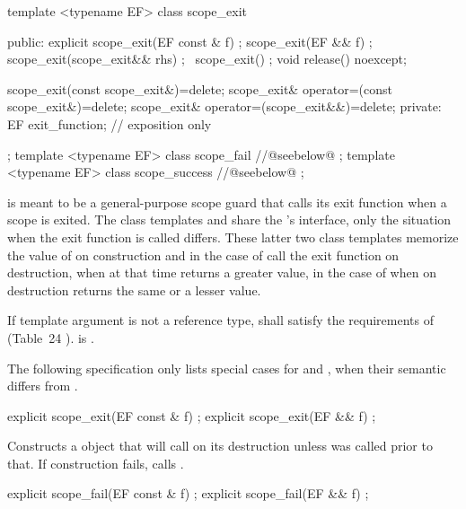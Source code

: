 \documentclass[ebook,11pt,article]{memoir}
\begin{document}
\begin{codeblock}
template <typename EF>
class scope_exit {
public:
  explicit
  scope_exit(EF const & f) ;
  scope_exit(EF && f) ;
  scope_exit(scope_exit&& rhs) ;
  ~scope_exit() ;
  void release() noexcept;

  scope_exit(const scope_exit&)=delete;
  scope_exit& operator=(const scope_exit&)=delete;
  scope_exit& operator=(scope_exit&&)=delete;
private:
  EF exit_function;    // exposition only
};
template <typename EF>
class scope_fail {
//@seebelow@
};
template <typename EF>
class scope_success {
//@seebelow@
};

\end{codeblock}
\pnum
\enternote
{} is meant to be a general-purpose scope guard that calls its exit function when a scope is exited. The class templates  and  share the 's interface, only the situation when the exit function is called differs. These latter two class templates memorize the value of  on construction and in the case of  call the exit function on destruction, when  at that time returns a greater value, in the case of  when  on destruction returns the same or a lesser value.
\exitnote


\pnum
\requires
If template argument  is not a reference type, 
 shall satisfy
the requirements of  (Table~24
).  is .

\pnum
The following specification only lists special cases for  and , when their semantic differs from .


\begin{itemdecl}
explicit
scope_exit(EF const & f) ;
explicit
scope_exit(EF && f) ;
\end{itemdecl}

\begin{itemdescr}
\pnum
\effects Constructs a  object that will call  on its destruction unless  was called prior to that. If construction fails, calls .
\end{itemdescr}

\begin{itemdecl}
explicit
scope_fail(EF const & f) ;
explicit
scope_fail(EF && f) ;
\end{itemdecl}
\end{document}
